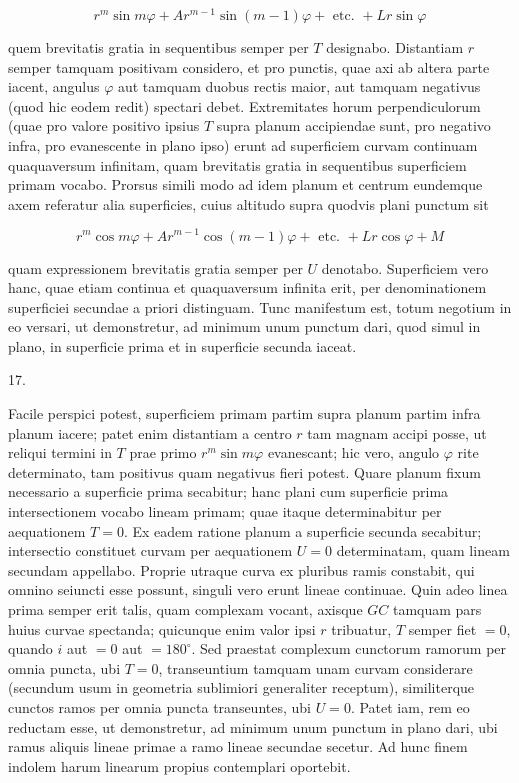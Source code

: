 \documentclass[10pt]{article}
\begin{document}
\[
r^{m} \sin m \varphi+A r^{m-1} \sin (m-1) \varphi+\text { etc. }+L r \sin \varphi
\]

quem brevitatis gratia in sequentibus semper per \(T\) designabo. Distantiam \(r\) semper tamquam positivam considero, et pro punctis, quae axi ab altera parte iacent, angulus \(\varphi\) aut tamquam duobus rectis maior, aut tamquam negativus (quod hic eodem redit) spectari debet. Extremitates horum perpendiculorum (quae pro valore positivo ipsius \(T\) supra planum accipiendae sunt, pro negativo infra, pro evanescente in plano ipso) erunt ad superficiem curvam continuam quaquaversum infinitam, quam brevitatis gratia in sequentibus superficiem primam vocabo. Prorsus simili modo ad idem planum et centrum eundemque axem referatur alia superficies, cuius altitudo supra quodvis plani punctum sit

\[
r^{m} \cos m \varphi+A r^{m-1} \cos (m-1) \varphi+\text { etc. }+L r \cos \varphi+M
\]

quam expressionem brevitatis gratia semper per \(U\) denotabo. Superficiem vero hanc, quae etiam continua et quaquaversum infinita erit, per denominationem
superficiei secundae a priori distinguam. Tunc manifestum est, totum negotium in eo versari, ut demonstretur, ad minimum unum punctum dari, quod simul in plano, in superficie prima et in superficie secunda iaceat.

17.

Facile perspici potest, superficiem primam partim supra planum partim infra planum iacere; patet enim distantiam a centro \(r\) tam magnam accipi posse, ut reliqui termini in \(T\) prae primo \(r^{m} \sin m \varphi\) evanescant; hic vero, angulo \(\varphi\) rite determinato, tam positivus quam negativus fieri potest. Quare planum fixum necessario a superficie prima secabitur; hanc plani cum superficie prima intersectionem vocabo lineam primam; quae itaque determinabitur per aequationem \(T=0\). Ex eadem ratione planum a superficie secunda secabitur; intersectio constituet curvam per aequationem \(U=0\) determinatam, quam lineam secundam appellabo. Proprie utraque curva ex pluribus ramis constabit, qui omnino seiuncti esse possunt, singuli vero erunt lineae continuae. Quin adeo linea prima semper erit talis, quam complexam vocant, axisque \(G C\) tamquam pars huius curvae spectanda; quicunque enim valor ipsi \(r\) tribuatur, \(T\) semper fiet \(=0\), quando \(i\) aut \(=0\) aut \(=180^{\circ}\). Sed praestat complexum cunctorum ramorum per omnia puncta, ubi \(T=0\), transeuntium tamquam unam curvam considerare (secundum usum in geometria sublimiori generaliter receptum), similiterque cunctos ramos per omnia puncta transeuntes, ubi \(U=0\). Patet iam, rem eo reductam esse, ut demonstretur, ad minimum unum punctum in plano dari, ubi ramus aliquis lineae primae a ramo lineae secundae secetur. Ad hunc finem indolem harum linearum propius contemplari oportebit.
\end{document}

